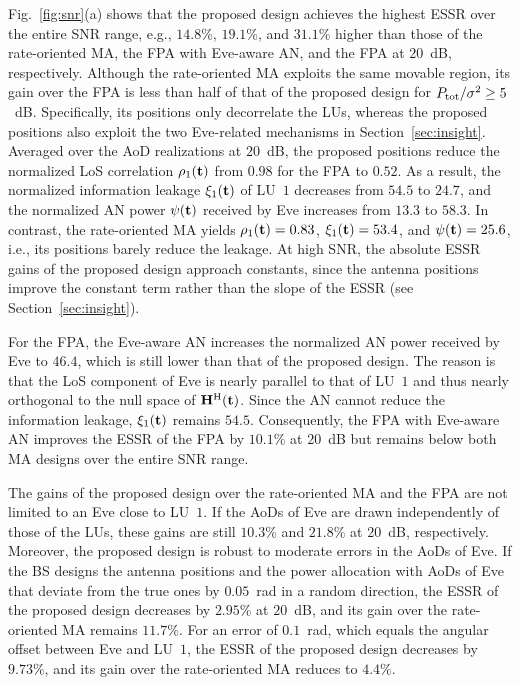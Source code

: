 \documentclass[journal]{IEEEtran}
\newcommand{\rev}[1]{{\color{red}#1}}
\newcommand{\rev}[1]{#1}
\begin{document}
Fig.~\ref{fig:snr}(a) shows that the proposed design achieves the highest ESSR over the entire SNR range, e.g., $14.8\%$, $19.1\%$, and $31.1\%$ higher than those of the rate-oriented MA, the FPA with Eve-aware AN, and the FPA at $20$~dB, respectively. Although the rate-oriented MA exploits the same movable region, its gain over the FPA is less than half of that of the proposed design \rev{for $P_{\mathrm{tot}}/\sigma^2\ge5$~dB}. Specifically, its positions only decorrelate the LUs, whereas the proposed positions also exploit the two Eve-related mechanisms in Section~\ref{sec:insight}. Averaged over the AoD realizations at $20$~dB, the proposed positions reduce the normalized LoS correlation $\rho_1(\mathbf{t})$ from $0.98$ for the FPA to $0.52$. As a result, the normalized information leakage $\xi_1(\mathbf{t})$ of LU~$1$ decreases from $54.5$ to $24.7$, and the normalized AN power $\psi(\mathbf{t})$ received by Eve increases from $13.3$ to $58.3$. In contrast, the rate-oriented MA yields $\rho_1(\mathbf{t})=0.83$, $\xi_1(\mathbf{t})=53.4$, and $\psi(\mathbf{t})=25.6$, i.e., its positions barely reduce the leakage. At high SNR, the absolute ESSR gains of the proposed design approach constants, since the antenna positions improve the constant term rather than the slope of the ESSR (see Section~\ref{sec:insight}).

For the FPA, the Eve-aware AN increases the normalized AN power received by Eve to $46.4$, which is still lower than that of the proposed design. The reason is that the LoS component of Eve is nearly parallel to that of LU~$1$ and thus nearly orthogonal to the null space of $\mathbf{H}^{\mathrm H}(\mathbf{t})$. Since the AN cannot reduce the information leakage, $\xi_1(\mathbf{t})$ remains $54.5$. Consequently, the FPA with Eve-aware AN improves the ESSR of the FPA by $10.1\%$ at $20$~dB but remains below both MA designs over the entire SNR range.

The gains of the proposed design \rev{over the rate-oriented MA and the FPA are not limited to an Eve close to} LU~$1$. If the AoDs of Eve are drawn independently of those of the LUs, \rev{these gains are still $10.3\%$ and $21.8\%$ at $20$~dB, respectively}. Moreover, the proposed design is robust to moderate errors in the AoDs of Eve. If the BS designs the antenna positions and the power allocation with AoDs of Eve that deviate from the true ones by $0.05$~rad in a random direction, the ESSR of the proposed design decreases by $2.95\%$ at $20$~dB, and its gain over the rate-oriented MA remains $11.7\%$. For an error of $0.1$~rad, which equals the angular offset between Eve and LU~$1$, \rev{the ESSR of the proposed design decreases by $9.73\%$, and its gain over the rate-oriented MA} reduces to $4.4\%$.
\end{document}
